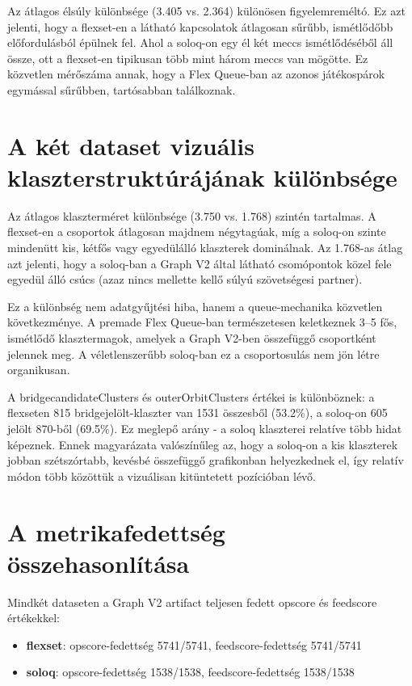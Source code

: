 ﻿\documentclass[a4paper,12pt]{report}
\begin{document}
Az átlagos élsúly különbsége (3.405 vs. 2.364) különösen figyelemreméltó. Ez azt jelenti, hogy a flexset-en a látható kapcsolatok átlagosan sűrűbb, ismétlődőbb előfordulásból épülnek fel. Ahol a soloq-on egy él két meccs ismétlődéséből áll össze, ott a flexset-en tipikusan több mint három meccs van mögötte. Ez közvetlen mérőszáma annak, hogy a Flex Queue-ban az azonos játékospárok egymással sűrűbben, tartósabban találkoznak.

\section{A két dataset vizuális klaszterstruktúrájának különbsége}

Az átlagos klaszterméret különbsége (3.750 vs. 1.768) szintén tartalmas. A flexset-en a csoportok átlagosan majdnem négytagúak, míg a soloq-on szinte mindenütt kis, kétfős vagy egyedülálló klaszterek dominálnak. Az 1.768-as átlag azt jelenti, hogy a soloq-ban a Graph V2 által látható csomópontok közel fele egyedül álló csúcs (azaz nincs mellette kellő súlyú szövetségesi partner).

Ez a különbség nem adatgyűjtési hiba, hanem a queue-mechanika közvetlen következménye. A premade Flex Queue-ban természetesen keletkeznek 3--5 fős, ismétlődő klasztermagok, amelyek a Graph V2-ben összefüggő csoportként jelennek meg. A véletlenszerűbb soloq-ban ez a csoportosulás nem jön létre organikusan.

A bridgecandidateClusters és outerOrbitClusters értékei is különböznek: a flexseten 815 bridgejelölt-klaszter van 1531 összesből (53.2\%), a soloq-on 605 jelölt 870-ből (69.5\%). Ez meglepő arány - a soloq klaszterei relatíve több hidat képeznek. Ennek magyarázata valószínűleg az, hogy a soloq-on a kis klaszterek jobban szétszórtabb, kevésbé összefüggő grafikonban helyezkednek el, így relatív módon több közöttük a vizuálisan kitüntetett pozícióban lévő.


\section{A metrikafedettség összehasonlítása}

Mindkét dataseten a Graph V2 artifact teljesen fedett opscore és feedscore értékekkel:

\begin{itemize}
    \item \textbf{flexset}: opscore-fedettség 5741/5741, feedscore-fedettség 5741/5741
    \item \textbf{soloq}: opscore-fedettség 1538/1538, feedscore-fedettség 1538/1538
\end{itemize}
\end{document}

